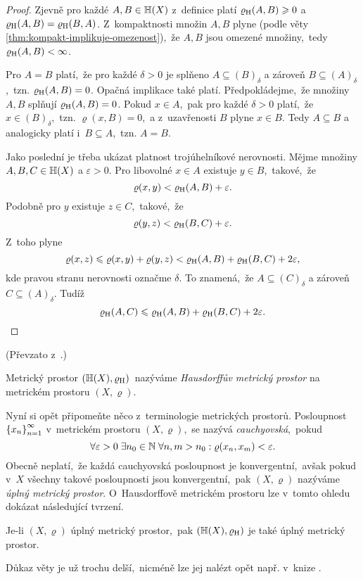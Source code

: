 \begin{proof}
    Zjevně pro každé $A,B\in\mathbb{H}(X)$ z~definice platí $\varrho_\textup{H}(A,B)\geqslant 0$ a $\varrho_\textup{H}(A,B)=\varrho_\textup{H}(B,A)$. Z~kompaktnosti množin $A,B$ plyne (podle věty \ref{thm:kompakt-implikuje-omezenost}),~že $A,B$ jsou omezené množiny,~tedy $\varrho_\textup{H}(A,B)<\infty$.
    
    Pro $A=B$ platí,~že pro každé $\delta>0$ je splňeno $A\subseteq (B)_\delta$ a zároveň $B\subseteq (A)_\delta$,~tzn. $\varrho_\textup{H}(A,B)=0$. Opačná implikace také platí. Předpokládejme,~že množiny $A,B$ splňují $\varrho_\textup{H}(A,B)=0$. Pokud $x\in A$,~pak pro každé $\delta>0$ platí,~že $x\in (B)_\delta$,~tzn. $\varrho(x,B)=0$,~a z~uzavřenosti $B$ plyne $x\in B$. Tedy $A\subseteq B$ a analogicky platí i~$B\subseteq A$,~tzn. $A=B$.

    Jako poslední je třeba ukázat platnost trojúhelníkové nerovnosti. Mějme množiny $A,B,C\in\mathbb{H}(X)$ a $\varepsilon>0$. Pro libovolné $x\in A$ existuje $y\in B$,~takové,~že
    \[\varrho(x,y)<\varrho_\textup{H}(A,B)+\varepsilon.\]
    Podobně pro $y$ existuje $z\in C$,~takové,~že
    \[\varrho(y,z)<\varrho_\textup{H}(B,C)+\varepsilon.\]
    Z~toho plyne
    \[\varrho(x,z)\leqslant\varrho(x,y)+\varrho(y,z)<\varrho_\textup{H}(A,B)+\varrho_\textup{H}(B,C)+2\varepsilon,\]
    kde pravou stranu nerovnosti označme $\delta$. To znamená,~že $A\subseteq (C)_\delta$ a zároveň $C\subseteq (A)_\delta$. Tudíž
    \[\varrho_\textup{H}(A,C)\leqslant\varrho_\textup{H}(A,B)+\varrho_\textup{H}(B,C)+2\varepsilon.\]
\end{proof}
(Převzato z~\citep[str. 72]{Edgar2008}.)
\begin{definition}\label{def:hausdorffuv-mp}
    Metrický prostor $(\mathbb{H}(X),\varrho_\textup{H})$~nazýváme \emph{Hausdorffův metrický prostor} na metrickém prostoru $(X,\varrho)$.
\end{definition}
Nyní si opět připomeňte něco z~terminologie metrických prostorů. Posloupnost $\left\{x_n\right\}_{n=1}^\infty$ v~metrickém prostoru $(X,\varrho)$,~se nazývá \emph{cauchyovská},~pokud
\[\forall\varepsilon>0\;\exists n_0\in\mathbb{N}\;\forall n,m>n_0: \varrho(x_n,x_m)<\varepsilon.\]
Obecně neplatí,~že každá cauchyovská posloupnost je konvergentní,~avšak pokud v~$X$ všechny takové posloupnosti jsou konvergentní,~pak $(X,\varrho)$ nazýváme \emph{úplný metrický prostor}. O~Hausdorffově metrickém prostoru lze v~tomto ohledu dokázat následující tvrzení.
\begin{theorem}\label{thm:uplnost-hmp}
    Je-li $(X,\varrho)$ úplný metrický prostor,~pak $(\mathbb{H}(X),\varrho_\textup{H})$ je také úplný metrický prostor.
\end{theorem}
Důkaz věty je už trochu delší,~nicméně lze jej nalézt opět např. v~knize \citep[str. 72]{Edgar2008}.